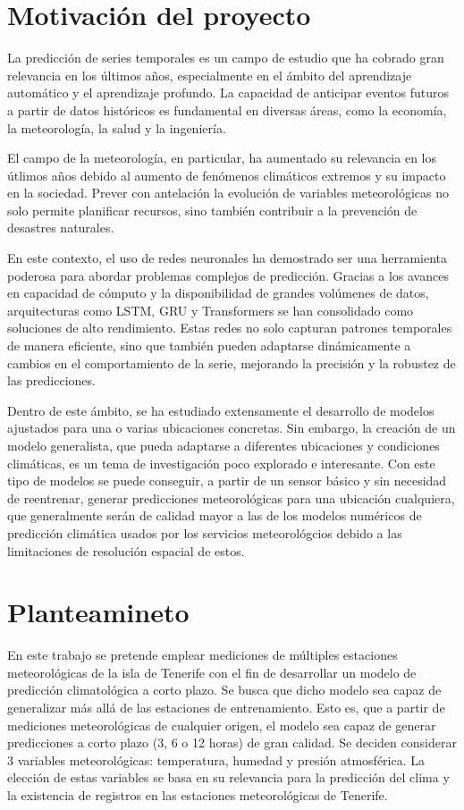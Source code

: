 \section{Motivación del proyecto}
La predicción de series temporales es un campo de estudio que ha cobrado gran relevancia en los últimos años, especialmente en el ámbito del aprendizaje automático y el aprendizaje profundo. 
La capacidad de anticipar eventos futuros a partir de datos históricos es fundamental en diversas áreas, como la economía, la meteorología, la salud y la ingeniería. 

El campo de la meteorología, en particular, ha aumentado su relevancia en los útlimos años debido al aumento de fenómenos climáticos extremos y su impacto en la sociedad. 
Prever con antelación la evolución de variables meteorológicas no solo permite planificar recursos, sino también contribuir a la prevención de desastres naturales.

En este contexto, el uso de redes neuronales ha demostrado ser una herramienta poderosa para abordar problemas complejos de predicción.
Gracias a los avances en capacidad de cómputo y la disponibilidad de grandes volúmenes de datos, arquitecturas como LSTM, GRU y Transformers se han consolidado como soluciones de alto rendimiento. 
Estas redes no solo capturan patrones temporales de manera eficiente, sino que también pueden adaptarse dinámicamente a cambios en el comportamiento de la serie, mejorando la precisión y la robustez de las predicciones.

Dentro de este ámbito, se ha estudiado extensamente el desarrollo de modelos ajustados para una o varias ubicaciones concretas. Sin embargo, la creación de un modelo generalista,
que pueda adaptarse a diferentes ubicaciones y condiciones climáticas, es un tema de investigación poco explorado e interesante. Con este tipo de modelos se puede 
conseguir, a partir de un sensor básico y sin necesidad de reentrenar, generar predicciones meteorológicas para una ubicación cualquiera, que generalmente serán de calidad mayor a las de los modelos numéricos de predicción 
climática usados por los servicios meteorológcios debido a las limitaciones de resolución espacial de estos.

\section{Planteamineto}
En este trabajo se pretende emplear mediciones de múltiples estaciones meteorológicas de la isla de Tenerife con el fin de desarrollar un modelo de predicción climatológica a corto plazo.
Se busca que dicho modelo sea capaz de generalizar más allá de las estaciones de entrenamiento. Esto es, que a partir de mediciones meteorológicas de cualquier origen, el modelo sea capaz de 
generar predicciones a corto plazo (3, 6 o 12 horas) de gran calidad.
Se deciden considerar 3 variables meteorológicas: temperatura, humedad y presión atmosférica.
La elección de estas variables se basa en su relevancia para la predicción del clima y la existencia de registros en las estaciones meteorológicas de Tenerife.

